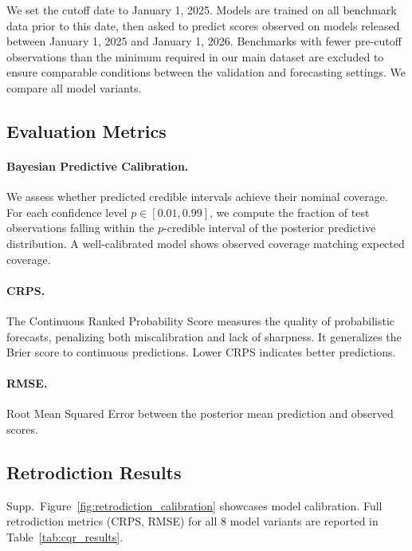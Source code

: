\documentclass[letterpaper,twocolumn]{article}
\newcommand{\revised}[1]{#1}
\begin{document}
We set the cutoff date to January 1, 2025. Models are trained on all benchmark data prior to this date, then asked to predict scores \revised{observed on models released between January 1, 2025 and January 1, 2026.} Benchmarks with fewer pre-cutoff observations than the minimum required in our main dataset are excluded to ensure comparable conditions between the validation and forecasting settings. We compare \revised{all} model variants.

\subsection{Evaluation Metrics}

\paragraph{Bayesian Predictive Calibration.} We assess whether predicted credible intervals achieve their nominal coverage. For each confidence level $p \in [0.01, 0.99]$, we compute the fraction of test observations falling within the $p$-credible interval of the posterior predictive distribution. A well-calibrated model shows observed coverage matching expected coverage.

\paragraph{CRPS.} The Continuous Ranked Probability Score measures the quality of probabilistic forecasts, penalizing both miscalibration and lack of sharpness. It generalizes the Brier score to continuous predictions. Lower CRPS indicates better predictions.

\paragraph{RMSE.} Root Mean Squared Error between the posterior mean prediction and observed scores.

\subsection{Retrodiction Results}

Supp.\ Figure~\ref{fig:retrodiction_calibration} showcases model calibration. \revised{Full retrodiction metrics (CRPS, RMSE) for all 8 model variants are reported in Table~\ref{tab:cqr_results}.}
\end{document}
